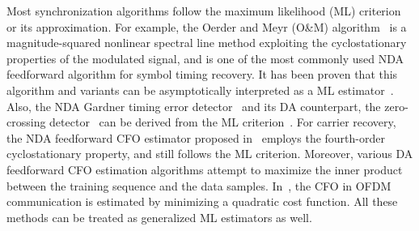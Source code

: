 \documentclass[12pt, draftclsnofoot, onecolumn]{IEEEtran}
\begin{document}



Most synchronization algorithms follow the maximum likelihood (ML) criterion or its approximation.
For example, the Oerder and Meyr (O\&M) algorithm~\cite{Oerder1988} is a magnitude-squared nonlinear spectral line method exploiting the cyclostationary properties of the modulated signal, 
and is one of the most commonly used NDA feedforward algorithm for symbol timing recovery.
It has been proven that this algorithm and variants can be asymptotically interpreted as a ML estimator~\cite{YanWang2002,Lopez-Salcedo2006}.
Also, the NDA Gardner timing error detector~\cite{Gardner1986} and its DA counterpart, the zero-crossing detector~\cite{gardner1988demodulator} can be derived from the ML criterion~\cite{Oerder1987}.
For carrier recovery, the NDA feedforward CFO estimator proposed in~\cite{Wang2004} employs the fourth-order cyclostationary property, and still follows the ML criterion.
Moreover, various DA feedforward CFO estimation algorithms attempt to maximize the inner product between the  training sequence and the data samples.
In~\cite{Li2008, Amar2017LowCommunication},
% 
% 
the CFO in OFDM communication is estimated by minimizing a quadratic cost function.
All these methods can be treated as generalized ML estimators as well.
\end{document}
